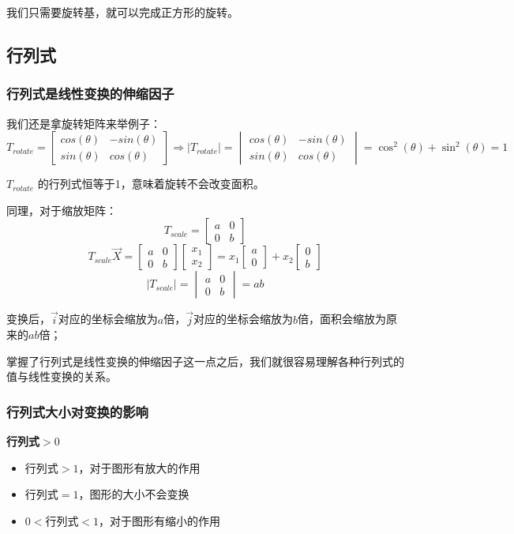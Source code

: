 \documentclass[12pt]{article}
\begin{document}
我们只需要旋转基，就可以完成正方形的旋转。

\subsection{行列式}
\subsubsection{行列式是线性变换的伸缩因子}
我们还是拿旋转矩阵来举例子：
$$
T_{rotate}=\begin{bmatrix}cos(\theta)&-sin(\theta)\\sin(\theta)&cos(\theta)\end{bmatrix} \Rightarrow |T_{rotate}| = \begin{vmatrix}cos(\theta)&-sin(\theta)\\sin(\theta)&cos(\theta)\end{vmatrix} = \cos^2(\theta) + \sin^2(\theta) = 1
$$

$T_{rotate}$ 的行列式恒等于1，意味着旋转不会改变面积。

同理，对于缩放矩阵：
$$
T_{scale} = \begin{bmatrix}a&0\\0&b\end{bmatrix}
$$
$$
T_{scale}\vec{X} = \begin{bmatrix}a&0\\0&b\end{bmatrix}
\begin{bmatrix}x_1\\x_2\end{bmatrix} = 
x_1\begin{bmatrix}a\\0\end{bmatrix} + 
x_2\begin{bmatrix}0\\b\end{bmatrix}
$$
$$
|T_{scale}| = \begin{vmatrix}a&0\\0&b\end{vmatrix} = ab
$$

变换后，$\vec{i}$对应的坐标会缩放为$a$倍，$\vec{j}$对应的坐标会缩放为$b$倍，面积会缩放为原来的$ab$倍；

掌握了行列式是线性变换的伸缩因子这一点之后，我们就很容易理解各种行列式的值与线性变换的关系。

\subsubsection{行列式大小对变换的影响}
\begin{framed}  
\textbf{行列式$>0$}
\begin{itemize}
    \item 行列式$>1$，对于图形有放大的作用
    \item 行列式$=1$，图形的大小不会变换
    \item $0<$行列式$<1$，对于图形有缩小的作用
\end{itemize}
\end{framed}
\end{document}
